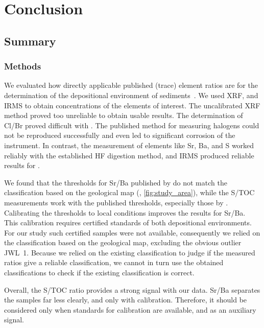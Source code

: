 \chapter{Conclusion}

\section{Summary}

\subsection{Methods}

We evaluated how directly applicable published (trace) element ratios are for the determination of the
depositional environment of sediments~\parencite{wei-2020,Worden_1996}. We used XRF, \ICPMS and IRMS to
obtain concentrations of the elements of interest. The uncalibrated XRF method proved too 
unreliable to obtain usable results.
The determination of Cl/Br proved difficult with \ICPMS. The published method for measuring halogens
\parencite{he_determination_2019} could not be reproduced successfully and even led to significant corrosion of the instrument. 
In contrast, the measurement of elements like Sr, Ba, and S worked reliably with the established
HF digestion method, and IRMS produced reliable results for \TOC.

We found that the thresholds for Sr/Ba published by \textcite{wei-2020} do not match the classification based
on the geological map (\textcite{Linth_Map}, \cref{fig:study_area}), while the S/TOC measurements work
with the published thresholds, especially those by \textcite{berner-raiswell-1983}.
Calibrating the thresholds to local conditions improves the results for Sr/Ba.
This calibration
requires certified standards of both depositional environments. For our study such certified
samples were not available, consequently we relied on the classification based on the geological map, 
excluding the obvious outlier JWL~1.
Because we relied on the existing classification to judge if the measured ratios give a reliable classification,
we cannot in turn use the obtained classifications to check if the existing classification is correct.

Overall, the S/TOC ratio provides a strong signal with our data. Sr/Ba separates the samples far less clearly,
and only with calibration. Therefore, it should be considered only when standards for calibration are
available, and as an auxiliary signal.

